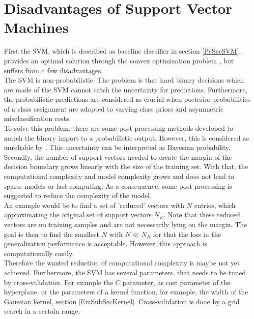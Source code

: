 \section{Disadvantages of Support Vector Machines}\label{PcSecIdea}
First the \acs{SVM}, which is described as baseline classifier in section \ref{PcSecSVM}, provides an optimal solution through the convex optimization problem \cite[p. 325]{Bishop.2009}, but suffers from a few disadvantages.\\
The \acs{SVM} is non-probabilistic.
The problem is that hard binary decisions which are made of the \acs{SVM} cannot catch the uncertainty for predictions.
Furthermore, the probabilistic predictions are considered as crucial when posterior probabilities of a class assignment are adapted to varying class priors and asymmetric misclassification costs.\cite[p. 239-240]{Tipping.2001}\\
To solve this problem, there are some post processing methods developed to match the binary import to a probabilistic output.
However, this is considered as unreliable by \cite[p. 239-240]{Tipping.2001}. 
This uncertainty can be interpreted as Bayesian probability.\cite[p. 21]{Bishop.2009}\newline 
Secondly, the number of support vectors needed to create the margin of the decision boundary grows linearly with the size of the training set.
With that, the computational complexity and model complexity grows and does not lead to sparse models or fast computing.
As a consequence, some post-processing is suggested to reduce the complexity of the model.\cite{Chen.2009}\\
An example would be to find a set of 'reduced' vectors with $N$ entries, which approximating the original set of support vectors $N_R$.
Note that these reduced vectors are no training samples and are not necessarily lying on the margin.
The goal is then to find the smallest $N$ with $N \ll N_R$ for that the loss in the generalization performance is acceptable.
However, this approach is computationally costly.\cite{Burges.1997}\\
Therefore the wanted reduction of computational complexity is maybe not yet achieved.\newline
Furthermore, the \ac{SVM} has several parameters, that needs to be tuned by cross-validation.
For example the $C$ parameter, as cost parameter of the hyperplane\cite[p. 420]{TrevorHastie.2009}, or the parameters of a kernel function, for example, the width of the Gaussian kernel, section \ref{EmSubSecKernel}.
Cross-validation is done by a grid search in a certain range.
